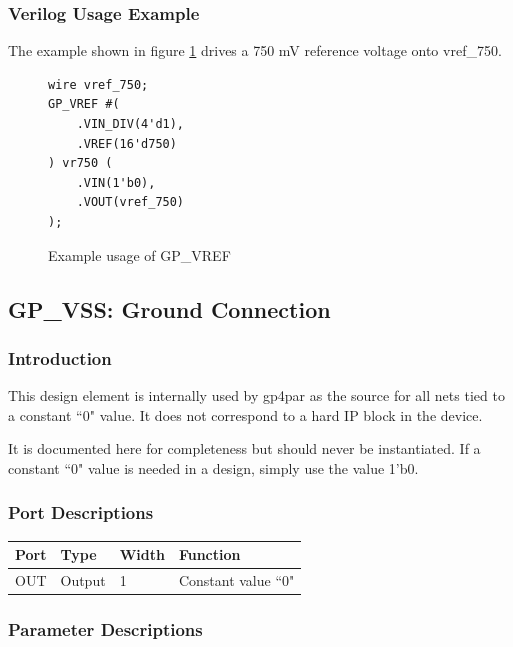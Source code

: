 \documentclass{article}
\begin{document}
\pagebreak
\subsubsection{Verilog Usage Example}

The example shown in figure \ref{gp-vref-example} drives a 750 mV reference voltage onto vref\_750.

\begin{figure}[h]
\begin{lstlisting}
wire vref_750;
GP_VREF #(
	.VIN_DIV(4'd1),
	.VREF(16'd750)
) vr750 (
	.VIN(1'b0),
	.VOUT(vref_750)
);
\end{lstlisting}
\caption{Example usage of GP\_VREF}
\label{gp-vref-example}
\end{figure}


\clearpage
\pagebreak
\subsection{GP\_VSS: Ground Connection}

\subsubsection{Introduction}
This design element is internally used by gp4par as the source for all nets tied to a constant ``0" value. It does not 
correspond to a hard IP block in the device.

It is documented here for completeness but should never be instantiated. If a constant ``0" value is needed in a 
design, simply use the value 1'b0.

\subsubsection{Port Descriptions}

\begin{tabularx}{4in}{|l|l|l|X|}
\hline
{\bfseries Port} & {\bfseries Type} & {\bfseries Width} & {\bfseries Function} \\
\hline
OUT & Output & 1 & Constant value ``0" \\
\hline
\end{tabularx}

\subsubsection{Parameter Descriptions}
\end{document}
